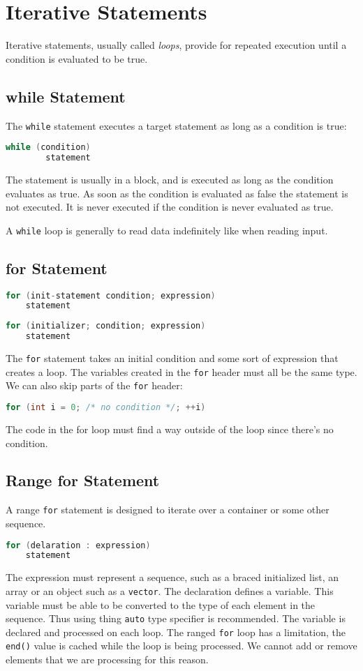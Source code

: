 \documentclass[12pt, a4paper]{report}
\begin{document}
\section{Iterative Statements}
Iterative statements, usually called \emph{loops}, provide for repeated execution until a condition is evaluated to be true.
\subsection{while Statement}
The \verb|while| statement executes a target statement as long as a condition is true:
\begin{lstlisting}[language=C++]
    while (condition)
        statement
\end{lstlisting}
The statement is usually in a block, and is executed as long as the condition evaluates as true.
As soon as the condition is evaluated as false the statement is not executed.
It is never executed if the condition is never evaluated as true.

A \verb|while| loop is generally to read data indefinitely like when reading input.

\subsection{for Statement}
\begin{lstlisting}[language=C++]
  for (init-statement condition; expression)
    statement
\end{lstlisting}
\begin{lstlisting}[language=C++]
  for (initializer; condition; expression)
    statement
\end{lstlisting}
The \verb|for| statement takes an initial condition and some sort of expression that creates a loop.
The variables created in the \verb|for| header must all be the same type.
We can also skip parts of the \verb|for| header:
\begin{lstlisting}[language=C++]
  for (int i = 0; /* no condition */; ++i)
\end{lstlisting}
The code in the for loop must find a way outside of the loop since there's no condition.

\subsection{Range for Statement}
A range \verb|for| statement is designed to iterate over a container or some other sequence.
\begin{lstlisting}[language=C++]
  for (delaration : expression)
    statement
\end{lstlisting}
The expression must represent a sequence, such as a braced initialized list, an array or an object such as a \verb|vector|.
The declaration defines a variable.
This variable must be able to be converted to the type of each element in the sequence.
Thus using thing \verb|auto| type specifier is recommended.
The variable is declared and processed on each loop.
The ranged \verb|for| loop has a limitation, the \verb|end()| value is cached while the loop is being processed.
We cannot add or remove elements that we are processing for this reason.
\end{document}
